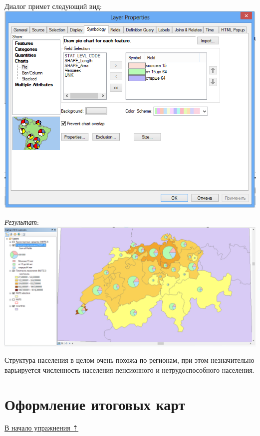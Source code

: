 \documentclass[12pt,]{book}
\begin{document}
\begin{enumerate}
  Диалог примет следующий вид:
  \includegraphics{images/Ex08/image29.png}

  \emph{Результат}:
  \includegraphics{images/Ex08/image30.png}
\end{enumerate}

Структура населения в целом очень похожа по регионам, при этом незначительно варьируется численность населения пенсионного и нетрудоспособного населения.

\hypertarget{stat-map-economic-design}{%
\section{Оформление итоговых карт}\label{stat-map-economic-design}}

\protect\hyperlink{stat-map-economic}{В начало упражнения ⇡}
\end{document}
